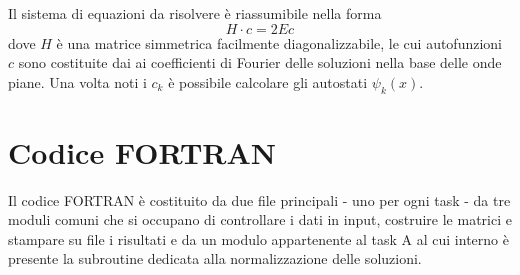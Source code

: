 \documentclass[a4paper,11pt]{article}
\begin{document}
Il sistema di equazioni da risolvere è riassumibile nella forma
\begin{equation}
H \cdot c = 2Ec
\end{equation}
dove $H$ è una matrice simmetrica facilmente diagonalizzabile, le cui autofunzioni $c$ sono costituite dai ai coefficienti di Fourier delle soluzioni nella base delle onde piane. Una volta noti i $c_k$ è possibile calcolare gli autostati $\psi_k(x)$.

\section*{Codice FORTRAN}

Il codice FORTRAN è costituito da due file principali - uno per ogni task - da tre moduli comuni che si occupano di controllare i dati in input, costruire le matrici e stampare su file i risultati e da un modulo appartenente al task A al cui interno è presente la subroutine dedicata alla normalizzazione delle soluzioni.\\
\end{document}
